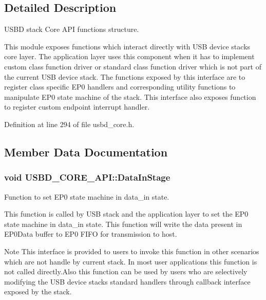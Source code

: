 \subsection{Detailed Description}
U\+S\+BD stack Core A\+PI functions structure. 

This module exposes functions which interact directly with U\+SB device stack\textquotesingle{}s core layer. The application layer uses this component when it has to implement custom class function driver or standard class function driver which is not part of the current U\+SB device stack. The functions exposed by this interface are to register class specific E\+P0 handlers and corresponding utility functions to manipulate E\+P0 state machine of the stack. This interface also exposes function to register custom endpoint interrupt handler. 

Definition at line 294 of file usbd\+\_\+core.\+h.



\subsection{Member Data Documentation}
\subsubsection[{\texorpdfstring{Data\+In\+Stage}{DataInStage}}]{\setlength{\rightskip}{0pt plus 5cm}void U\+S\+B\+D\+\_\+\+C\+O\+R\+E\+\_\+\+A\+P\+I\+::\+Data\+In\+Stage}\hypertarget{structUSBD__CORE__API_abe1068288a0eb073f7c9eee1466d4fae}{}\label{structUSBD__CORE__API_abe1068288a0eb073f7c9eee1466d4fae}
Function to set E\+P0 state machine in data\+\_\+in state.

This function is called by U\+SB stack and the application layer to set the E\+P0 state machine in data\+\_\+in state. This function will write the data present in E\+P0\+Data buffer to E\+P0 F\+I\+FO for transmission to host. ~\newline
\begin{DoxyNote}{Note}
This interface is provided to users to invoke this function in other scenarios which are not handle by current stack. In most user applications this function is not called directly.\+Also this function can be used by users who are selectively modifying the U\+SB device stack\textquotesingle{}s standard handlers through callback interface exposed by the stack.
\end{DoxyNote}

